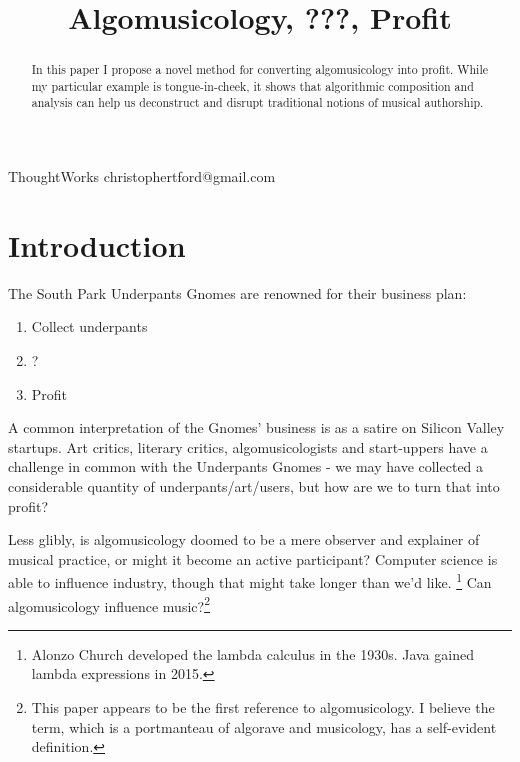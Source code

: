 \documentclass[numbers]{sigplanconf}
\begin{document}
\setlength{\pdfpageheight}{\paperheight}
\setlength{\pdfpagewidth}{\paperwidth}


\title{Algomusicology, ???, Profit}

           {ThoughtWorks}
           {christophertford@gmail.com}

\maketitle

\begin{abstract}
In this paper I propose a novel method for converting algomusicology into profit. While my particular example
is tongue-in-cheek, it shows that algorithmic composition and analysis can help us deconstruct and disrupt
traditional notions of musical authorship.
\end{abstract}



\section{Introduction}

The South Park Underpants Gnomes are renowned for their business plan:
\begin{enumerate}
    \item Collect underpants
    \item ?
    \item Profit
\end{enumerate}

A common interpretation of the Gnomes' business is as a satire on Silicon Valley startups. Art critics, literary critics,
algomusicologists and start-uppers have a challenge in common with the Underpants Gnomes
- we may have collected a considerable quantity of underpants/art/users, but how are we to turn that into profit?

Less glibly, is algomusicology doomed to be a mere observer and explainer of musical practice, or might it become an
active participant? Computer science is able to influence industry, though that might take longer than we'd like.
\footnote{Alonzo Church developed the lambda calculus in the 1930s. Java gained lambda expressions in 2015.} Can
algomusicology influence music?\footnote{This paper appears to be the first reference to algomusicology. I believe the term,
which is a portmanteau of algorave and musicology, has a self-evident definition.}
\end{document}
